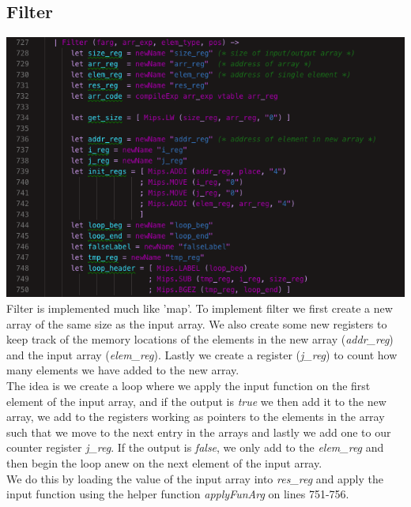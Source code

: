 \subsection{Filter}
\includegraphics[width=\linewidth]{Materials/CodeGen/filterIntro}
Filter is implemented much like 'map'. To implement filter we first create a new array of the same size as the input array. We also create some new registers to keep track of the memory locations of the elements in the new array (\textit{addr\_reg}) and the input array (\textit{elem\_reg}). Lastly we create a register (\textit{j\_reg}) to count how many elements we have added to the new array.\\
The idea is we create a loop where we apply the input function on the first element of the input array, and if the output is \textit{true} we then add it to the new array, we add to the registers working as pointers to the elements in the array such that we move to the next entry in the arrays and lastly we add one to our counter register \textit{j\_reg}. If the output is \textit{false}, we only add to the \textit{elem\_reg} and then begin the loop anew on the next element of the input array.\\
We do this by loading the value of the input array into \textit{res\_reg} and apply the input function using the helper function \textit{applyFunArg} on lines 751-756.
 
